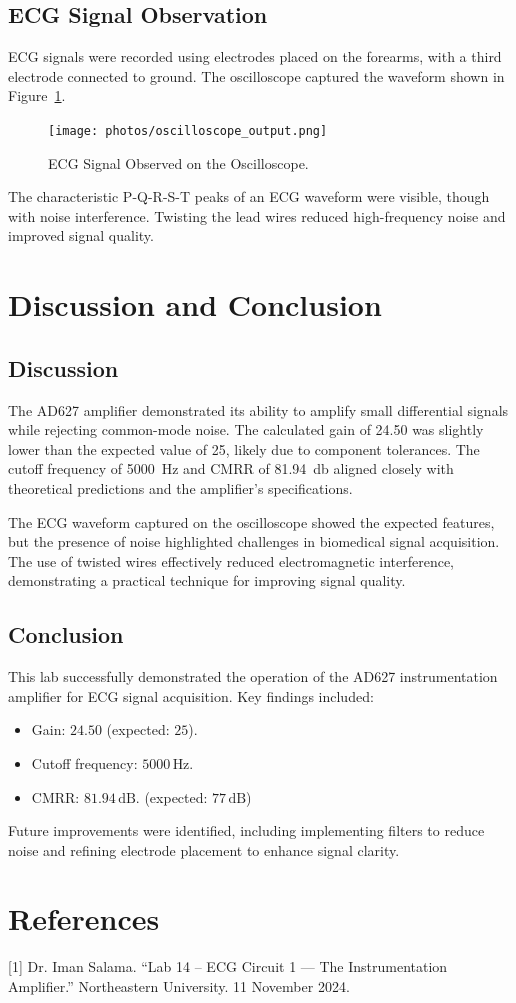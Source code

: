 \subsection{ECG Signal Observation}
ECG signals were recorded using electrodes placed on the forearms, with a third electrode connected to ground. The oscilloscope
captured the waveform shown in Figure~\ref{fig:ecg_output}.

\begin{figure}[H]
  \centering
  \texttt{[image: photos/oscilloscope\_output.png]}
  \caption{ECG Signal Observed on the Oscilloscope.}
  \label{fig:ecg_output}
\end{figure}

The characteristic P-Q-R-S-T peaks of an ECG waveform were visible, though with noise interference. Twisting the lead wires
reduced high-frequency noise and improved signal quality.

\section{Discussion and Conclusion}

\subsection{Discussion}
The AD627 amplifier demonstrated its ability to amplify small differential signals while rejecting common-mode noise. The
calculated gain of 24.50 was slightly lower than the expected value of 25, likely due to component tolerances. The cutoff frequency
of 5000~\si{\hertz} and CMRR of 81.94~\si{\decibel} aligned closely with theoretical predictions and the amplifier's specifications.
\newline

The ECG waveform captured on the oscilloscope showed the expected features, but the presence of noise highlighted challenges in
biomedical signal acquisition. The use of twisted wires effectively reduced electromagnetic interference, demonstrating a practical
technique for improving signal quality.

\subsection{Conclusion}
This lab successfully demonstrated the operation of the AD627 instrumentation amplifier for ECG signal acquisition. Key findings
included:
\begin{itemize}
  \item Gain: \( 24.50 \) (expected: \( 25 \)).
  \item Cutoff frequency: \( 5000 \, \text{Hz} \).
  \item CMRR: \( 81.94 \, \text{dB} \). (expected: \( 77 \, \text{dB} \))
\end{itemize}
Future improvements were identified, including implementing filters to reduce noise and refining electrode placement to enhance
signal clarity.

\section{References}
[1] Dr. Iman Salama. “Lab 14 – ECG Circuit 1 --- The Instrumentation Amplifier.” Northeastern University. 11 November 2024.


